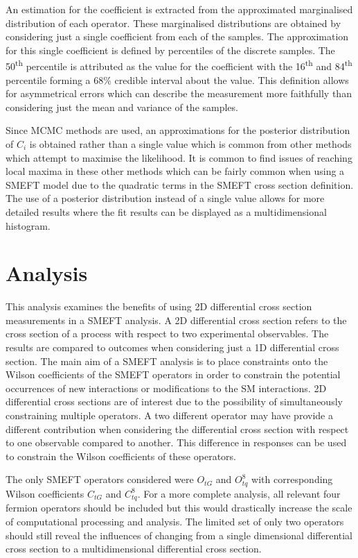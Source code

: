 \documentclass[a4paper,11pt]{article}
\newcommand{\ts}{\textsuperscript}
\begin{document}
An estimation for the coefficient is extracted from the approximated marginalised distribution of each operator.
These marginalised distributions are obtained by considering just a single coefficient from each of the samples.
The approximation for this single coefficient is defined by percentiles of the discrete samples.
The 50\ts{th} percentile is attributed as the value for the coefficient with the 16\ts{th} and 84\ts{th} percentile forming a 68\% credible interval about the value.
This definition allows for asymmetrical errors which can describe the measurement more faithfully than considering just the mean and variance of the samples.

Since MCMC methods are used, an approximations for the posterior distribution of $C_{i}$ is obtained rather than a single value which is common from other methods which attempt to maximise the likelihood.
It is common to find issues of reaching local maxima in these other methods which can be fairly common when using a SMEFT model due to the quadratic terms in the SMEFT cross section definition.
The use of a posterior distribution instead of a single value allows for more detailed results where the fit results can be displayed as a multidimensional histogram.

\section{Analysis}\label{sec:analysis}

This analysis examines the benefits of using 2D differential cross section measurements in a SMEFT analysis.
A 2D differential cross section refers to the cross section of a process with respect to two experimental observables.
The results are compared to outcomes when considering just a 1D differential cross section.
The main aim of a SMEFT analysis is to place constraints onto the Wilson coefficients of the SMEFT operators in order to constrain the potential occurrences of new interactions or modifications to the SM interactions.
2D differential cross sections are of interest due to the possibility of simultaneously constraining multiple operators.
A two different operator may have provide a different contribution when considering the differential cross section with respect to one observable compared to another.
This difference in responses can be used to constrain the Wilson coefficients of these operators.

The only SMEFT operators considered were $O_{tG}$ and $O_{tq}^{8}$ with corresponding Wilson coefficients $C_{tG}$ and $C_{tq}^8$.
For a more complete analysis, all relevant four fermion operators should be included but this would drastically increase the scale of computational processing and analysis.
The limited set of only two operators should still reveal the influences of changing from a single dimensional differential cross section to a multidimensional differential cross section.
\end{document}
